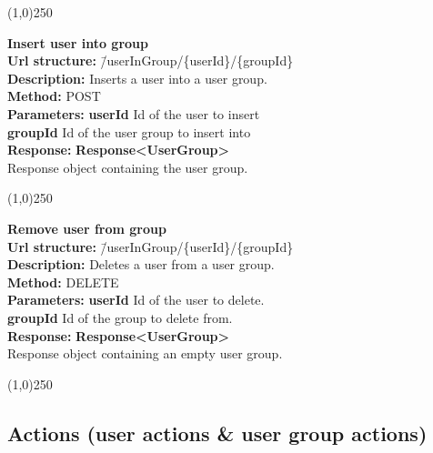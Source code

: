 \documentclass[11pt]{article}
\begin{document}
\begin{center}\line(1,0){250}\end{center}

\begin{tabbing}
\textbf{Insert user into group} \\
\textcolor{black!60}{\textbf{Url structure:}} \hspace{0.2in} \= /userInGroup/\{userId\}/\{groupId\} \\
\textcolor{black!60}{\textbf{Description:}}  \> Inserts a user into a user group. \\
\textcolor{black!60}{\textbf{Method:}} \> POST \\
\textcolor{black!60}{\textbf{Parameters:}} \> \textbf{userId} Id of the user to insert \\
\> \textbf{groupId} Id of the user group to insert into \\
\textcolor{black!60}{\textbf{Response:}} \> \textbf{Response<UserGroup>} \\
\> Response object containing the user group.
\end{tabbing}

\begin{center}\line(1,0){250}\end{center}

\begin{tabbing}
\textbf{Remove user from group} \\
\textcolor{black!60}{\textbf{Url structure:}} \hspace{0.2in} \= /userInGroup/\{userId\}/\{groupId\} \\
\textcolor{black!60}{\textbf{Description:}}  \> Deletes a user from a user group. \\
\textcolor{black!60}{\textbf{Method:}} \> DELETE \\
\textcolor{black!60}{\textbf{Parameters:}} \> \textbf{userId} Id of the user to delete. \\
\> \textbf{groupId} Id of the group to delete from. \\
\textcolor{black!60}{\textbf{Response:}} \> \textbf{Response<UserGroup>} \\
\> Response object containing an empty user group.
\end{tabbing}

\begin{center}\line(1,0){250}\end{center}

\subsection{Actions (user actions \& user group actions)}
\end{document}
